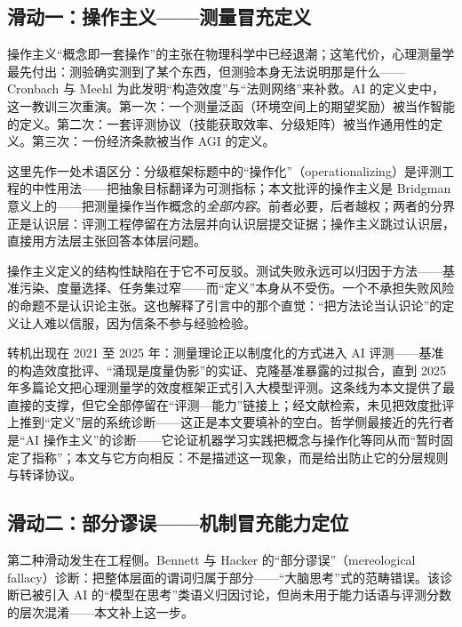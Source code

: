 \documentclass[10pt,fontset=fandol]{ctexart}
\begin{document}
\subsection{滑动一：操作主义——测量冒充定义}

操作主义“概念即一套操作”的主张\cite{bridgman1927logic}在物理科学中已经退潮；这笔代价，心理测量学最先付出：测验确实测到了某个东西，但测验本身无法说明那是什么——Cronbach 与 Meehl 为此发明“构造效度”与“法则网络”来补救\cite{cronbach1955construct}。AI 的定义史中，这一教训三次重演。第一次：一个测量泛函（环境空间上的期望奖励）被当作智能的定义\cite{legg2007universal}。第二次：一套评测协议（技能获取效率、分级矩阵）被当作通用性的定义\cite{chollet2019measure,morris2023levels}。第三次：一份经济条款被当作 AGI 的定义\cite{openai2018charter}。

这里先作一处术语区分：分级框架标题中的“操作化”（operationalizing）\cite{morris2023levels}是评测工程的中性用法——把抽象目标翻译为可测指标；本文批评的操作主义是 Bridgman 意义上的——把测量操作当作概念的\emph{全部内容}。前者必要，后者越权；两者的分界正是认识层：评测工程停留在方法层并向认识层提交证据；操作主义跳过认识层，直接用方法层主张回答本体层问题。

操作主义定义的结构性缺陷在于它不可反驳。测试失败永远可以归因于方法——基准污染\cite{zhang2024gsm1k}、度量选择\cite{schaeffer2023mirage}、任务集过窄——而“定义”本身从不受伤。一个不承担失败风险的命题不是认识论主张。这也解释了引言中的那个直觉：“把方法论当认识论”的定义让人难以信服，因为信条不参与经验检验。

转机出现在 2021 至 2025 年：测量理论正以制度化的方式进入 AI 评测——基准的构造效度批评\cite{raji2021benchmark}、“涌现是度量伪影”的实证\cite{schaeffer2023mirage}、克隆基准暴露的过拟合\cite{zhang2024gsm1k}，直到 2025 年多篇论文把心理测量学的效度框架正式引入大模型评测\cite{bean2025measuring,salaudeen2025measurement,wallach2024evaluating,jo2025benchmark,xiao2023metriceval}。这条线为本文提供了最直接的支撑，但它全部停留在“评测—能力”链接上；经文献检索，未见把效度批评上推到“定义”层的系统诊断——这正是本文要填补的空白。哲学侧最接近的先行者是“AI 操作主义”的诊断\cite{mussgnug2024operationalism}——它论证机器学习实践把概念与操作化等同从而“暂时固定了指称”；本文与它方向相反：不是描述这一现象，而是给出防止它的分层规则与转译协议。

\subsection{滑动二：部分谬误——机制冒充能力定位}

第二种滑动发生在工程侧。Bennett 与 Hacker 的“部分谬误”（mereological fallacy）诊断：把整体层面的谓词归属于部分——“大脑思考”式的范畴错误\cite{bennett2003philosophical}。该诊断已被引入 AI 的“模型在思考”类语义归因讨论\cite{vantill2024personification,helliwell2024wittgenstein}，但尚未用于能力话语与评测分数的层次混淆——本文补上这一步。
\end{document}
